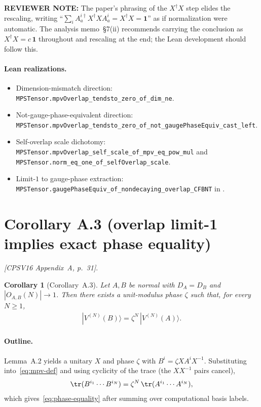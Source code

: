 \documentclass{article}
\newcommand{\leanid}[1]{\texttt{#1}}
\newcommand{\paperref}[1]{\textit{[CPSV16 #1]}}
\theoremstyle{plain}
\newtheorem{corollary}{Corollary}
\begin{document}
\textbf{REVIEWER NOTE:} The paper's phrasing of the $X^\dagger X$ step
elides the rescaling, writing ``$\sum_i A^{i\dagger}_a X^\dagger X
    A^i_a = X^\dagger X = \mathbf{1}$'' as if normalization were automatic.
The analysis memo~\S7(ii) recommends carrying the conclusion as
$X^\dagger X = c\,\mathbf{1}$ throughout and rescaling at the end; the
Lean development should follow this.

\paragraph{Lean realizations.}
\begin{itemize}
    \item Dimension-mismatch direction:
          \leanid{MPSTensor.mpvOverlap\_tendsto\_zero\_of\_dim\_ne}.
    \item Not-gauge-phase-equivalent direction:
          \leanid{MPSTensor.mpvOverlap\_tendsto\_zero\_of\_not\_gaugePhaseEquiv\_cast\_left}.
    \item Self-overlap scale dichotomy:
          \leanid{MPSTensor.mpvOverlap\_self\_scale\_of\_mpv\_eq\_pow\_mul}
          and \leanid{MPSTensor.norm\_eq\_one\_of\_selfOverlap\_scale}.
    \item Limit-$1$ to gauge-phase extraction:
          \leanid{MPSTensor.gaugePhaseEquiv\_of\_nondecaying\_overlap\_CFBNT}
          in .
\end{itemize}

\section{Corollary A.3 (overlap limit-1 implies exact phase equality)}
\label{sec:cor-A3}

\paperref{Appendix~A, p.~31}.

\begin{corollary}[Corollary~A.3]
    Let $A, B$ be normal with $D_A = D_B$ and $|O_{A,B}(N)| \to 1$. Then
    there exists a unit-modulus phase $\zeta$ such that, for every $N \ge 1$,
    \begin{align}
        |V^{(N)}(B)\rangle = \zeta^N\,|V^{(N)}(A)\rangle.
        \label{eq:phase-equality}
    \end{align}
\end{corollary}

\paragraph{Outline.}
Lemma~A.2 yields a unitary $X$ and phase $\zeta$ with $B^i = \zeta X A^i
    X^{-1}$. Substituting into~\eqref{eq:mpv-def} and using cyclicity of the
trace (the $X X^{-1}$ pairs cancel),
\begin{align}
    \tr(B^{i_1} \cdots B^{i_N}) = \zeta^N\,\tr(A^{i_1} \cdots A^{i_N}),
\end{align}
which gives~\eqref{eq:phase-equality} after summing over computational
basis labels.
\end{document}
